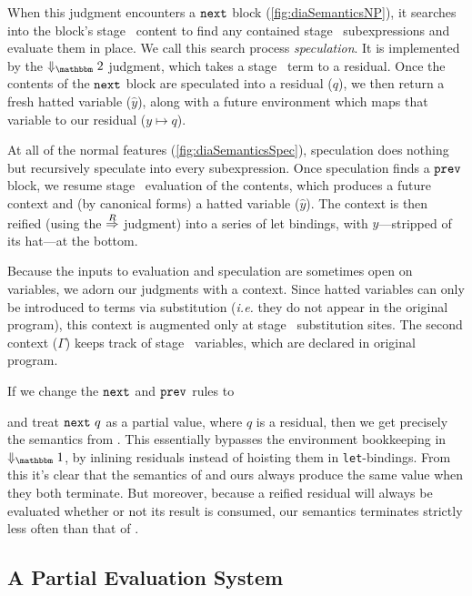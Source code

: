 When this judgment encounters a ${\tt next}$ block (\ref{fig:diaSemanticsNP}), it searches into the block's stage \bbtwo\ content to find any contained stage
\bbone\ subexpressions and evaluate them in place.  
We call this search process \emph{speculation}. It is implemented by the $\redtwosym$ judgment, which takes a stage \bbtwo\ term to a residual.
Once the contents of the ${\tt next}$ block are speculated into a residual ($q$), 
we then return a fresh hatted variable ($\hat y$), 
along with a future environment which maps that variable to our residual ($y \mapsto q$).

At all of the normal features (\ref{fig:diaSemanticsSpec}), speculation does nothing but recursively speculate into every subexpression.
Once speculation finds a ${\tt prev}$ block, we resume stage \bbone\ evaluation of the contents, which produces a future context and (by canonical forms) a hatted variable ($\hat y$).
The context is then reified (using the $\overset{R}\Rightarrow$ judgment) into a series of let bindings, with $y$---stripped of its hat---at the bottom.

Because the inputs to evaluation and speculation are sometimes open on variables, we adorn our judgments with a context.
Since hatted variables can only be introduced to terms via substitution ({\em i.e.} they do not appear in the original program), 
this context is augmented only at stage \bbone\ substitution sites.
The second context ($\Gamma$) keeps track of stage \bbtwo\ variables, which are declared in original program.

If we change the ${\tt next}$ and ${\tt prev}$ rules to 
and treat ${\tt next}~q$ as a partial value, where $q$ is a residual,
then we get precisely the semantics from \cite{davies96}. This essentially bypasses the
environment bookkeeping in $\redonesym$, by inlining residuals instead of
hoisting them in \verb|let|-bindings.
From this it's clear that the semantics of \cite{davies96} and ours always produce the same value when they both terminate.
But moreover, because a reified residual will always be evaluated whether or not its result is consumed, 
our semantics terminates strictly less often than that of \cite{davies96}.

\subsection {A Partial Evaluation System}

